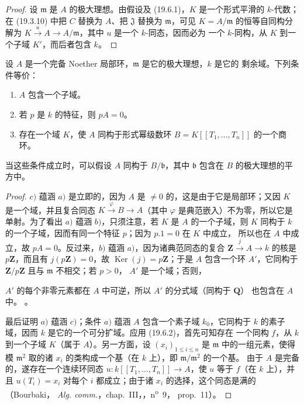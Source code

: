\begin{proof}
设 $\mathfrak m$ 是 $A$ 的极大理想。由假设及 (19.6.1)，$K$ 是一个形式平滑的
$k$-代数；在 (19.3.10) 中把 $C$ 替换为 $A$、把 $\mathfrak J$ 替换为
$\mathfrak m$，可见 $K=A/\mathfrak m$ 的恒等自同构分解为
$K\xrightarrow{u}A\to A/\mathfrak m$，其中 $u$ 是一个 $k$-同态，因而必为
一个 $k$-同构，从 $K$ 到一个子域 $K'$，而后者包含 $k$。
\end{proof}

\begin{corollary}[19.6.3]
\label{0.19.6.3-fr}
设 $A$ 是一个完备 Noether 局部环，$\mathfrak m$ 是它的极大理想，$k$ 是它的
剩余域。下列条件等价：
\begin{enumerate}
  \item[a)] $A$ 包含一个子域。
  \item[b)] 若 $p$ 是 $k$ 的特征，则 $pA=0$。
  \item[c)] 存在一个域 $K$，使 $A$ 同构于形式幂级数环
  $B=K[[T_1,\ldots,T_n]]$ 的一个商环。
\end{enumerate}
当这些条件成立时，可以假设 $A$ 同构于 $B/\mathfrak b$，其中
$\mathfrak b$ 包含在 $B$ 的极大理想的平方中。
\end{corollary}

\begin{proof}
$c)$ 蕴涵 $a)$ 是立即的，因为 $A$ 是 $\neq0$ 的，这是由于它是局部环；又因
$K$ 是一个域，并且复合同态
$K\xrightarrow{\varphi}B\to A$（其中 $\varphi$ 是典范嵌入）不为零，所以它是
单射。为了看出 $a)$ 蕴涵 $b)$，只须注意，若 $K$ 是 $A$ 的一个子域，则 $K$
同构于 $k$ 的一个子域，因而有同一个特征 $p$；因为 $p.1=0$ 在 $K$ 中成立，
所以也在 $A$ 中成立，故 $pA=0$。反过来，$b)$ 蕴涵 $a)$，因为诸典范同态的复合
$\mathbf Z\xrightarrow{j}A\to k$ 的核是 $p\mathbf Z$，而且有
$j(p\mathbf Z)=0$，故 $\operatorname{Ker}(j)=p\mathbf Z$；于是 $A$ 包含一个环
$A'$，它同构于 $\mathbf Z/p\mathbf Z$ 且与 $\mathfrak m$ 不相交；若 $p>0$，
$A'$ 是一个域；否则，


$A'$ 的每个非零元素都在 $A$ 中可逆，所以 $A'$ 的分式域（同构于 $\mathbf Q$）
也包含在 $A$ 中。
。

最后证明 $a)$ 蕴涵 $c)$；条件 $a)$ 蕴涵 $A$ 包含一个素子域 $k_0$，它同构于
$k$ 的素子域，因而 $k$ 是它的一个可分扩域。应用 (19.6.2)，首先可知存在
一个同构 $f$，从 $k$ 到一个子域 $K$（属于 $A$）。另一方面，设
$(x_i)_{1\leq i\leq n}$ 是 $\mathfrak m$ 中的一组元素，使得模
$\mathfrak m^2$ 取的诸 $x_i$ 的类构成一个基（在 $k$ 上），即
$\mathfrak m/\mathfrak m^2$ 的一个基。
由于 $A$ 是完备的，遂存在一个连续环同态
$u:k[[T_1,\ldots,T_n]]\to A$，使 $u$ 等于 $f$（在 $k$ 上），并且
$u(T_i)=x_i$ 对每个 $i$ 都成立；由于诸 $x_i$ 的选择，这个同态是满的（Bourbaki，
\emph{Alg. comm.}，chap.~III，，n\textsuperscript{o}~9，
prop.~11）。
\end{proof}

